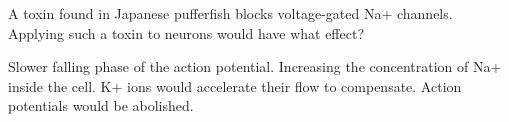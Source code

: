 \documentclass[answers]{exam}
\begin{document}
\begin{questions}
\question A toxin found in Japanese pufferfish blocks voltage-gated Na+ channels. Applying such a toxin to neurons would have what effect?
\begin{choices}
\choice Slower falling phase of the action potential.
\choice Increasing the concentration of Na+ inside the cell.
\choice K+ ions would accelerate their flow to compensate.
\correctchoice Action potentials would be abolished.
\end{choices}

\end{questions}
\end{document}
